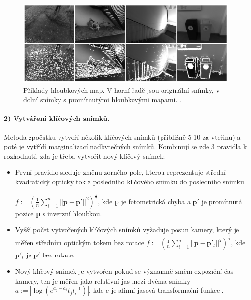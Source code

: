 \documentclass[12pt,a4paper]{article}
\begin{document}
\begin{figure}[H]
\centering
\includegraphics[scale=0.64]{img/Obr5_b.png}
\caption{Příklady hloubkových map. V horní řadě jsou originální snímky, v dolní snímky s promítnutými hloubkovými mapami.  \cite{Engel2018_DSO}.}
\end{figure}

\paragraph*{2) Vytváření klíčových snímků.} Metoda zpočátku vytvoří několik klíčových snímků (přibližně 5-10 za vteřinu) a poté je vytřídí marginalizací nadbytečných snímků. Kombinují se zde 3 pravidla k rozhodnutí, zda je třeba vytvořit nový klíčový snímek:
\begin{itemize}
\item První pravidlo sleduje změnu zorného pole, kterou reprezentuje střední kvadratický optický tok z posledního klíčového snímku do posledního snímku
 
\( f:=(\frac{1}{n}\sum_{i=1}^n||\textbf{p}-\textbf{p}'||^2)^\frac{1}{2} \), kde \textbf{p} je fotometrická chyba a \(\textbf{p}'\) je promítnutá pozice \textbf{p} s inverzní hloubkou.

\item Vyšší počet vytvořených klíčových snímků vyžaduje posun kamery, který je měřen středním optickým tokem bez rotace \( f:=(\frac{1}{n}\sum_{i=1}^n||\textbf{p}-\textbf{p}'_t||^2)^\frac{1}{2} \), kde \(\textbf{p}'_t\) je \(\textbf{p}'\) bez rotace.

\item Nový klíčový snímek je vytvořen pokud se významně změní expoziční čas kamery, ten je měřen jako relativní jas mezi dvěma snímky \( a:=|\log(e^{a_j-a_i} t_j t_i^{-1})| \), kde \( e \) je afinní jasová transformační funkce \cite{Engel2018_DSO}.
\end{itemize}
\end{document}
